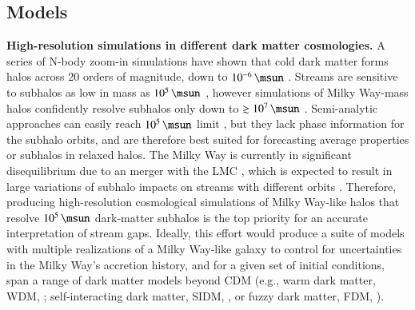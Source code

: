 \documentclass[final,5p,times,twocolumn,authoryear]{elsarticle}
\begin{document}
\subsection{Models}
\textbf{High-resolution simulations in different dark matter cosmologies.}
A series of N-body zoom-in simulations have shown that cold dark matter forms halos across 20 orders of magnitude, down to $10^{-6}\,\unit{\msun}$ \citep[approximately Earth mass,][]{diemand:2005, springel:2008, wangj:2020}.
Streams are sensitive to subhalos as low in mass as $10^5\,\unit{\msun}$ \citep[e.g.,][]{drlica-wagner:2019}, however simulations of Milky Way-mass halos confidently resolve subhalos only down to $\gtrsim10^7\,\unit{\msun}$ \citep[cf.][]{wetzel:2016, richings:2020, nadler:2023, mansfield:2023}.
Semi-analytic approaches can easily reach $10^5\,\unit{\msun}$ limit \citep[][]{press:1974,sheth:2002,benson:2012}, but they lack phase information for the subhalo orbits, and are therefore best suited for forecasting average properties or subhalos in relaxed halos.
The Milky Way is currently in significant disequilibrium due to an  merger with the LMC \citep[e.g.,][]{besla:2007,kallivayalil:2013,vasiliev:2023,vasiliev:2024}, which is expected to result in large variations of subhalo impacts on streams with different orbits \citep{barry:2023,arora:2023}.
Therefore, producing high-resolution cosmological simulations of Milky Way-like halos that resolve $10^5\,\unit{\msun}$ dark-matter subhalos is the top priority for an accurate interpretation of stream gaps.
Ideally, this effort would produce a suite of models with multiple realizations of a Milky Way-like galaxy to control for uncertainties in the Milky Way's accretion history, and for a given set of initial conditions, span a range of dark matter models beyond CDM (e.g., warm dark matter, WDM, \citealt{bode:2001}; self-interacting dark matter, SIDM, \citealt{spergel:2000}, or fuzzy dark matter, FDM, \citealt{hu:2000}).
\end{document}
